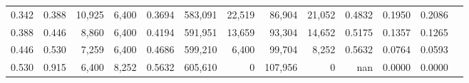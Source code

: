 \begin{tabular}{rrrrrrrrrrrrr}
0.342 & 0.388 &  10,925 & 6,400 &                                     0.3694 & 583,091 &  22,519 &  86,904 &  21,052 & 0.4832 & 0.1950 & 0.2086 \\
0.388 & 0.446 &   8,860 & 6,400 &                                     0.4194 & 591,951 &  13,659 &  93,304 &  14,652 & 0.5175 & 0.1357 & 0.1265 \\
0.446 & 0.530 &   7,259 & 6,400 &                                     0.4686 & 599,210 &   6,400 &  99,704 &   8,252 & 0.5632 & 0.0764 & 0.0593 \\
0.530 & 0.915 &   6,400 & 8,252 &                                     0.5632 & 605,610 &       0 & 107,956 &       0 &    nan & 0.0000 & 0.0000 \\
\bottomrule
\end{tabular}
